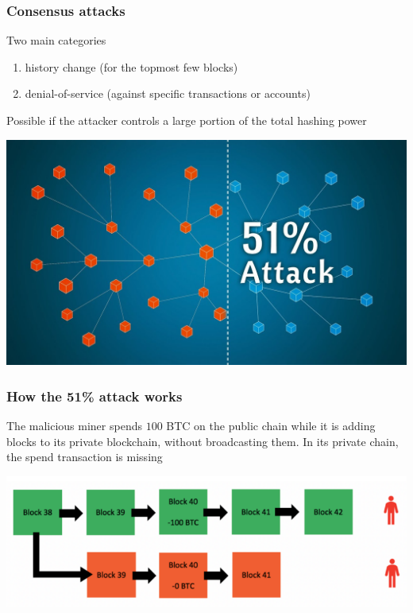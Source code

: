 \documentclass[11pt]{beamer}  %
\begin{document}
\begin{frame}\frametitle{Consensus attacks}

  \begin{greenbox}{Two main categories}
    \begin{enumerate}
    \item history change (for the topmost few blocks)
    \item denial-of-service (against specific transactions or accounts)
    \end{enumerate}
  \end{greenbox}

  \bigskip

  Possible if the attacker controls a large portion of the total hashing power

  \begin{center}
    \includegraphics[scale=0.17,clip=false]{pictures/51-percenters.jpg}
  \end{center}

\end{frame}

\begin{frame}\frametitle{How the 51\% attack works}

  \begin{greenbox}{The malicious miner spends $100$ BTC on the public chain
      while it is adding blocks to its
      private blockchain, without broadcasting them. In its private chain,
      the spend transaction is missing}
    \begin{center}
      \includegraphics[width=\textwidth,clip=false]{pictures/51attack_1.png}
    \end{center}
  \end{greenbox}

\end{frame}
\end{document}
